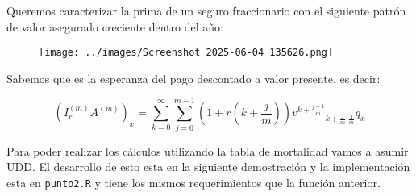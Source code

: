 Queremos caracterizar la prima de un seguro fraccionario con el siguiente patrón de valor asegurado creciente dentro del año:

\begin{figure}[H]
    \centering
    \texttt{[image: ../images/Screenshot 2025-06-04 135626.png]}
\end{figure}

Sabemos que es la esperanza del pago descontado a valor presente, es decir: 

\begin{equation*}
    (I^{(m)}_rA^{(m)})_x = \sum_{k=0}^\infty \sum_{j=0}^{m-1} \left(1+r\left(k+\frac{j}{m}\right)\right) v^{k+\frac{j+1}{m}} {}_{k + \frac{j}{m}|\frac{1}{m}} q_x
\end{equation*}

Para poder realizar los cálculos utilizando la tabla de mortalidad vamos a asumir UDD. El desarrollo de esto esta en la siguiente demostración y la implementación esta en \texttt{punto2.R} y tiene los mismos requerimientos que la función anterior.